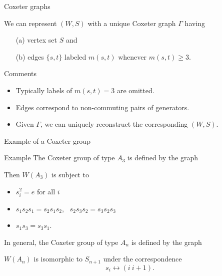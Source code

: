 \documentclass[9pt]{beamer}
\begin{document}
\begin{frame}{Coxeter graphs}
\begin{definition} We can represent $(W,S)$ with a unique \alert{Coxeter graph} $\Gamma$ having \begin{enumerate}
    \item[(a)] vertex set $S$ and
    \item[(b)] edges $\{s,t\}$ labeled $m(s,t)$ whenever $m(s,t)\geq 3$.
\end{enumerate}
\end{definition}
    \pause
\begin{block}{Comments}
\begin{itemize}
\item Typically labels of $m(s,t)=3$ are omitted.
\item Edges correspond to non-commuting pairs of generators.
\item Given $\Gamma$, we can uniquely reconstruct the corresponding $(W,S)$.
\end{itemize}
\end{block}

\end{frame}


\begin{frame}{Example of a Coxeter group}
\begin{block}{Example}
    The Coxeter group of type $A_3$ is defined by the graph
\begin{center} 
\end{center}

    Then $W(A_{3})$ is subject to
\begin{itemize}
\item $s_{i}^{2}=e$ for all $i$
\item $s_{1}s_{2}s_{1}=s_{2}s_{1}s_{2}$,~ $s_{2}s_{3}s_{2}=s_{3}s_{2}s_{3}$
\item $s_{1}s_{3}=s_{3}s_{1}$.
\end{itemize}

    \pause
    In general, the Coxeter group of type $A_n$ is defined by the graph
\begin{center}
\end{center}

    $W(A_n)$ is isomorphic to $S_{n+1}$ under the correspondence $$s_i \longleftrightarrow (i~i+1).$$
\end{block}
\end{frame}
\end{document}
